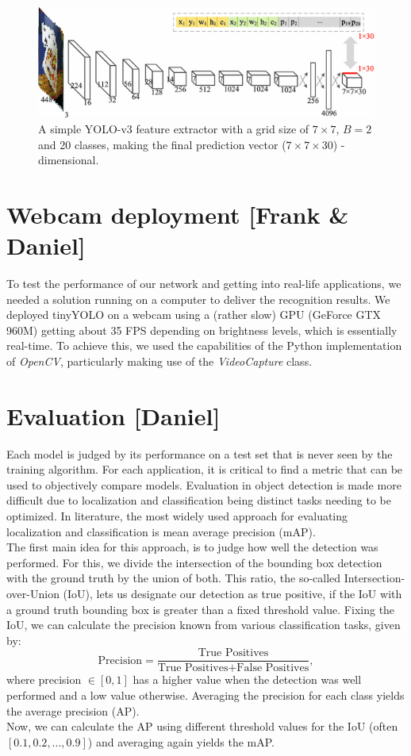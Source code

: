 \documentclass[a4paper]{article}
\begin{document}
\begin{figure}[h]
\includegraphics[width=1\linewidth]{images/tinyyolo}
\caption{A simple YOLO-v3 feature extractor with a grid size of $7\times 7$, $B=2$ and 20 classes, making the final prediction vector ($7 \times 7 \times 30$) - dimensional. }
\end{figure}
\newpage


\section{Webcam deployment [Frank \& Daniel]}
To test the performance of our network and getting into real-life applications, we needed a solution running on a computer to deliver the recognition results. We deployed tinyYOLO on a webcam using a (rather slow) GPU (GeForce GTX 960M) getting about 35 FPS depending on brightness levels, which is essentially real-time. To achieve this, we used the capabilities of the Python implementation of \textit{OpenCV}, particularly making use of the \textit{VideoCapture} class.

\section{Evaluation [Daniel]}
Each model is judged by its performance on a test set that is never seen by the training algorithm. For each application, it is critical to find a metric that can be used to objectively compare models.
Evaluation in object detection is made more difficult due to localization and classification being distinct tasks needing to be optimized.  
In literature, the most widely used approach for evaluating localization and classification is mean average precision (mAP).  \\
The first main idea for this approach, is to judge how well the detection was performed.  For this, we divide the intersection of the bounding box detection with the ground truth by the union of both.  This ratio, the so-called Intersection-over-Union (IoU), lets us designate our detection as true positive, if the IoU with a ground truth bounding box is greater than a fixed threshold value.
Fixing the IoU, we can calculate the precision known from various classification tasks, given by:
\[\text{Precision} = \frac{\text{True Positives}}{\text{True Positives}+\text{False Positives}}, \]
where precision $\in [0,1]$ has a higher value when the detection was well performed and a low value otherwise.
Averaging the precision for each class yields the average precision (AP). \\
Now, we can calculate the AP using different threshold values for the IoU (often $[0.1, 0.2, ... ,0.9]$) and averaging again yields the mAP.
\end{document}
